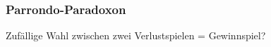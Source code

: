 %
%
%
\bgroup
\begin{frame}
\setlength{\abovedisplayskip}{5pt}
\setlength{\belowdisplayskip}{5pt}
\frametitle{Parrondo-Paradoxon}
\begin{center}
\Large
Zufällige
Wahl zwischen zwei Verlustspielen = Gewinnspiel?
\end{center}
\end{frame}
\egroup
